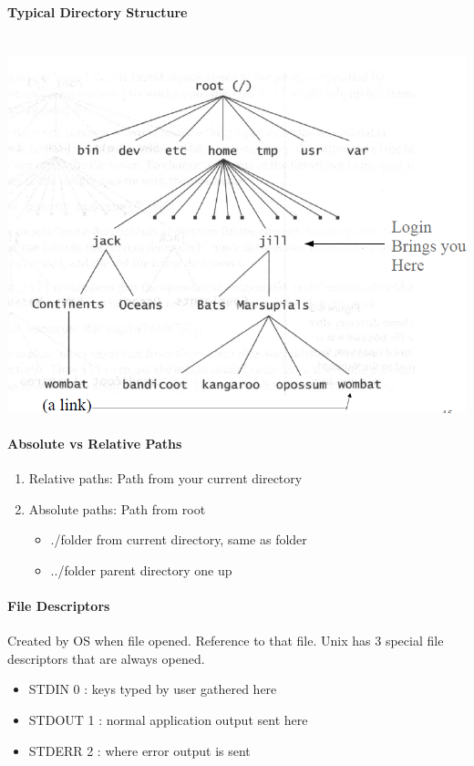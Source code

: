 \documentclass[12 pt]{article}
\begin{document}
	\paragraph{Typical Directory Structure}~\\
	\includegraphics[scale=0.5]{dst}
	\paragraph{Absolute vs Relative Paths}
	\begin{enumerate}[.]
		\item Relative paths: Path from your current directory
		\item Absolute paths: Path from root
		\begin{itemize}
			\item ./folder from current directory, same as folder
			\item ../folder parent directory one up
		\end{itemize}
	\end{enumerate}
	\paragraph{File Descriptors} Created by OS when file opened. Reference to that file. Unix has 3 special file descriptors that are always opened.
	\begin{itemize}
		\item STDIN 0 : keys typed by user gathered here
		\item STDOUT 1 : normal application output sent here
		\item STDERR 2 : where error output is sent
	\end{itemize}
\end{document}
